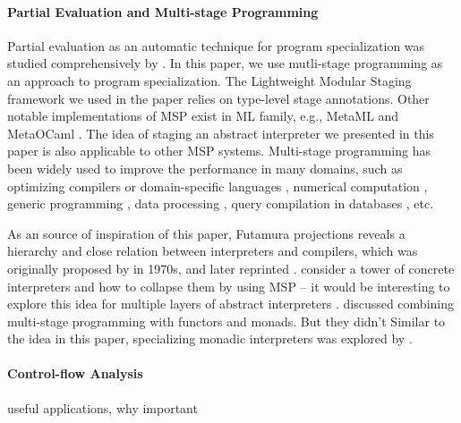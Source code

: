 \paragraph{Partial Evaluation and Multi-stage Programming}
Partial evaluation as an automatic technique for program specialization
was studied comprehensively by \citet{10.1007/3-540-61580-6_11, DBLP:books/daglib/0072559}.
In this paper, we use mutli-stage programming as an approach to
program specialization. The Lightweight Modular Staging framework \cite{DBLP:conf/gpce/RompfO10}
we used in the paper relies on type-level stage annotations.
Other notable implementations of MSP exist in ML family, e.g.,
MetaML \cite{DBLP:conf/pepm/TahaS97} and MetaOCaml
\cite{DBLP:conf/gpce/CalcagnoTHL03, DBLP:conf/flops/Kiselyov14}.
The idea of staging an abstract interpreter we presented in this paper is also
applicable to other MSP systems.
Multi-stage programming has been widely used to improve the performance in many
domains, such as optimizing compilers or domain-specific languages
\cite{DBLP:conf/pldi/RompfSBLCO14, DBLP:conf/snapl/RompfBLSJAOSKDK15,
DBLP:journals/tecs/SujeethBLRCOO14, DBLP:conf/gpce/SujeethGBLROO13,
DBLP:journals/jfp/CaretteKS09}, numerical computation \cite{PGL-038,
DBLP:conf/pepm/AktemurKKS13}, generic programming
\cite{DBLP:journals/pacmpl/Yallop17, Ofenbeck:2017:SGP:3136040.3136060}, data
processing \cite{DBLP:conf/oopsla/JonnalageddaCSRO14,
DBLP:conf/popl/KiselyovBPS17}, query compilation in databases
\cite{DBLP:conf/osdi/EssertelTDBOR18, DBLP:conf/sigmod/TahboubER18}, etc.

As an source of inspiration of this paper, Futamura projections reveals a
hierarchy and close relation between interpreters and compilers, which was
originally proposed by \citeauthor{futamura1971partial} in 1970s\cite{futamura1971partial},
and later reprinted \cite{Futamura1999}.
\citeauthor{Amin:2017:CTI:3177123.3158140} consider a tower of concrete
interpreters and how to collapse them by using MSP -- it would be
interesting to explore this idea for multiple layers of abstract interpreters
\cite{Cousot:2019:AAI:3302515.3290355, Giacobazzi:2015:APA:2676726.2676987}.
\citet{10.1007/11561347_18} discussed combining
multi-stage programming with functors and monads. But they didn't 
Similar to the idea in this paper, specializing monadic interpreters was
explored by \citet{DBLP:conf/dsl/SheardBP99, danvy1991compiling}. 

\paragraph{Control-flow Analysis} useful applications, why important
